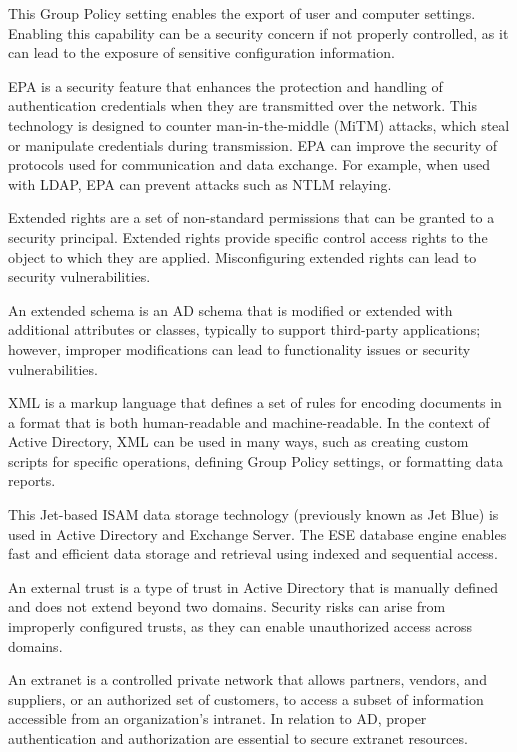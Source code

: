  This Group Policy setting enables the export of user and computer settings. Enabling this capability can be a security concern if not properly controlled, as it can lead to the exposure of sensitive configuration information.

 EPA is a security feature that enhances the protection and handling of authentication credentials when they are transmitted over the network. This technology is designed to counter man-in-the-middle (MiTM) attacks, which steal or manipulate credentials during transmission. EPA can improve the security of protocols used for communication and data exchange. For example, when used with LDAP, EPA can prevent attacks such as NTLM relaying.

 Extended rights are a set of non-standard permissions that can be granted to a security principal. Extended rights provide specific control access rights to the object to which they are applied. Misconfiguring extended rights can lead to security vulnerabilities.

An extended schema is an AD schema that is modified or extended with additional attributes or classes, typically to support third-party applications; however, improper modifications can lead to functionality issues or security vulnerabilities.

XML is a markup language that defines a set of rules for encoding documents in a format that is both human-readable and machine-readable. In the context of Active Directory, XML can be used in many ways, such as creating custom scripts for specific operations, defining Group Policy settings, or formatting data reports.

 This Jet-based ISAM data storage technology (previously known as Jet Blue) is used in Active Directory and Exchange Server. The ESE database engine enables fast and efficient data storage and retrieval using indexed and sequential access.

 An external trust is a type of trust in Active Directory that is manually defined and does not extend beyond two domains. Security risks can arise from improperly configured trusts, as they can enable unauthorized access across domains.

 An extranet is a controlled private network that allows partners, vendors, and suppliers, or an authorized set of customers, to access a subset of information accessible from an organization’s intranet. In relation to AD, proper authentication and authorization are essential to secure extranet resources.

